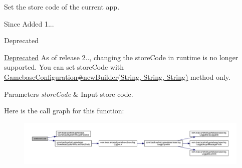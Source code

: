 Set the store code of the current app. 

\begin{DoxySince}{Since}
Added 1... 
\end{DoxySince}
\begin{DoxyRefDesc}{Deprecated}
\item[\hyperlink{deprecated__deprecated000003}{Deprecated}]As of release 2.., changing the store\+Code in runtime is no longer supported. You can set store\+Code with \hyperlink{classcom_1_1toast_1_1android_1_1gamebase_1_1_gamebase_configuration_a7c28786c8e446dd54cb5f4d0797b6564}{Gamebase\+Configuration\#new\+Builder(\+String, String, String)} method only. \end{DoxyRefDesc}

\begin{DoxyParams}{Parameters}
{\em store\+Code} & Input store code. \\
\hline
\end{DoxyParams}
Here is the call graph for this function\+:
\nopagebreak
\begin{figure}[H]
\begin{center}
\leavevmode
\includegraphics[width=350pt]{classcom_1_1toast_1_1android_1_1gamebase_1_1_gamebase_1_1_purchase_a8933fcc2fc156c87feee53efadfa4bb0_cgraph}
\end{center}
\end{figure}
